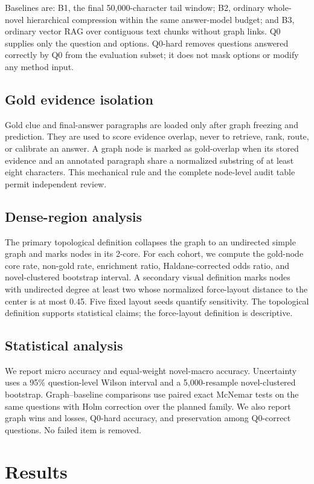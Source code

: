 \documentclass[11pt,a4paper]{article}
\begin{document}
Baselines are: B1, the final 50,000-character tail window; B2, ordinary whole-novel hierarchical compression within the same answer-model budget; and B3, ordinary vector RAG over contiguous text chunks without graph links. Q0 supplies only the question and options. Q0-hard removes questions answered correctly by Q0 from the evaluation subset; it does not mask options or modify any method input.

\subsection{Gold evidence isolation}
Gold clue and final-answer paragraphs are loaded only after graph freezing and prediction. They are used to score evidence overlap, never to retrieve, rank, route, or calibrate an answer. A graph node is marked as gold-overlap when its stored evidence and an annotated paragraph share a normalized substring of at least eight characters. This mechanical rule and the complete node-level audit table permit independent review.

\subsection{Dense-region analysis}
The primary topological definition collapses the graph to an undirected simple graph and marks nodes in its 2-core. For each cohort, we compute the gold-node core rate, non-gold rate, enrichment ratio, Haldane-corrected odds ratio, and novel-clustered bootstrap interval. A secondary visual definition marks nodes with undirected degree at least two whose normalized force-layout distance to the center is at most 0.45. Five fixed layout seeds quantify sensitivity. The topological definition supports statistical claims; the force-layout definition is descriptive.

\subsection{Statistical analysis}
We report micro accuracy and equal-weight novel-macro accuracy. Uncertainty uses a 95\% question-level Wilson interval and a 5,000-resample novel-clustered bootstrap. Graph--baseline comparisons use paired exact McNemar tests on the same questions with Holm correction over the planned family. We also report graph wins and losses, Q0-hard accuracy, and preservation among Q0-correct questions. No failed item is removed.

\section{Results}
\end{document}
